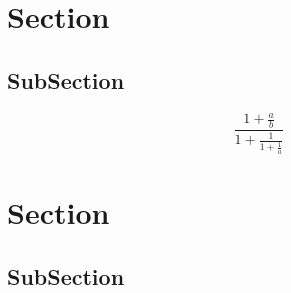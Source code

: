 \documentclass[a4paper]{article}
\begin{document}
\section{Section}

\subsection{SubSection}

\[ \frac{1+\frac{a}{b}}{1+\frac{1}{1+\frac{1}{a}}} \]

\section{Section}

\subsection{SubSection}
\end{document}
